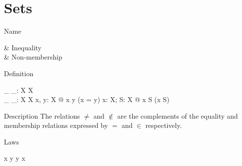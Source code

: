 \section{Sets}\label{s:setlib}
\begin{manpage}\label{p:10}
\item[Name]
\begin{name}
        \neq   & Inequality\symdex{$\neq$} \\
        \notin & Non-membership%
			\symdex{$\notin$}
\end{name}

\item[Definition]
\begin{gendef}[X]
        \_ \neq \_: X \rel X \\
        \_ \notin \_: X \rel \power X
\where
        \forall x, y: X @ x \neq y \iff \lnot (x = y)
\also
        \forall x: X; S: \power X @ x \notin S \iff \lnot (x \in S)
\end{gendef}

\item[Description]
The relations $\neq$ and $\notin$ are the complements of the 
equality and membership
relations expressed by $=$ and $\in$ respectively.

\item[Laws]
\begin{laws}
        x \neq y \implies y \neq x
\end{laws}
\end{manpage}

